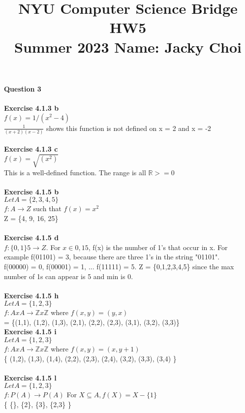 \documentclass[11pt]{article}
\title{\textbf{NYU Computer Science Bridge HW5}\\
Summer 2023 Name: Jacky Choi}
\date{}
\begin{document}
\setul{}{2pt}
\maketitle

\noindent \textbf{Question 3}\\\\
\textbf{Exercise 4.1.3 b }\\
$f(x) = 1/(x^2 - 4)$\\
$\frac{1}{(x+2)(x-2)}$ shows this function is not defined on x = 2 and x = -2\\\\
\textbf{Exercise 4.1.3 c }\\
$f(x) = \sqrt{(x^2)}$\\
This is a well-defined function. The range is all $\mathbb{R} >= 0$ \\\\
\textbf{Exercise 4.1.5 b }\\
$Let A = \{2,3,4,5\}$\\
$f: A \rightarrow Z$ such that $f(x) = x^2$\\
Z = \{4, 9, 16, 25\}\\\\
\textbf{Exercise 4.1.5 d }\\
$f: \{0,1\}5 \rightarrow Z$. For $x \in {0,1}5$, f(x) is the number of 1's that occur in x. For example f(01101) = 3, because there are three 1's in the string "01101".\\
f(00000) = 0, f(00001) = 1, ... f(11111) = 5. Z = \{0,1,2,3,4,5\} since the max number of 1s can appear is 5 and min is 0.\\\\
\textbf{Exercise 4.1.5 h }\\
$Let A = \{1,2,3\}$\\
$f: A x A \rightarrow \mathbb{Z} x \mathbb{Z}$ where $f(x,y) = (y,x)$\\
= \{(1,1), (1,2), (1,3), (2,1), (2,2), (2,3), (3,1), (3,2), (3,3)\}\\
\textbf{Exercise 4.1.5 i }\\
$Let A = \{1,2,3\}$\\
$f: A x A \rightarrow \mathbb{Z} x \mathbb{Z}$ where $f(x,y) = (x, y+1)$\\
\{  (1,2), (1,3), (1,4), (2,2), (2,3), (2,4),  (3,2), (3,3), (3,4) \}\\\\
\textbf{Exercise 4.1.5 l }\\
$Let A = \{1,2,3\}$\\
$f: P(A) \rightarrow P(A)$ For $X \subseteq A, f(X) = X - \{1\}$\\
\{ \{\}, \{2\}, \{3\}, \{2,3\} \}\\\\
\end{document}
